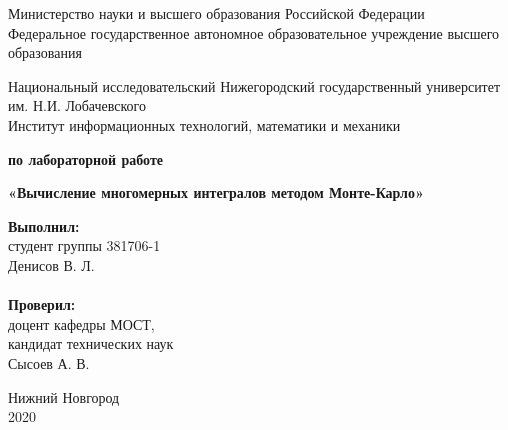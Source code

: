 \documentclass{report}
\begin{document}
\begin{titlepage}

\begin{center}
Министерство науки и высшего образования Российской Федерации \\
Федеральное государственное автономное образовательное учреждение высшего образования
\end{center}

\begin{center}
Национальный исследовательский Нижегородский государственный университет им. Н.И. Лобачевского \\
Институт информационных технологий, математики и механики
\end{center}

\vspace{4em}

\begin{center}
\textbf{ по лабораторной работе} \\
\end{center}
\begin{center}
\textbf{\Large«Вычисление многомерных интегралов методом Монте-Карло»} \\
\end{center}

\vspace{4em}

\newbox{\lbox}
\newlength{\maxl}
\setlength{\maxl}{\wd\lbox}
\hfill\parbox{7cm}{
\hspace*{5cm}\hspace*{-5cm}\textbf{Выполнил:} \\ студент группы 381706-1 \\ Денисов В. Л.\\
\\
\hspace*{5cm}\hspace*{-5cm}\textbf{Проверил:}\\ доцент кафедры МОСТ, \\ кандидат технических наук \\ Сысоев А. В.
}

\vspace{\fill}

\begin{center} Нижний Новгород \\ 2020 \end{center}

\end{titlepage}
\end{document}

